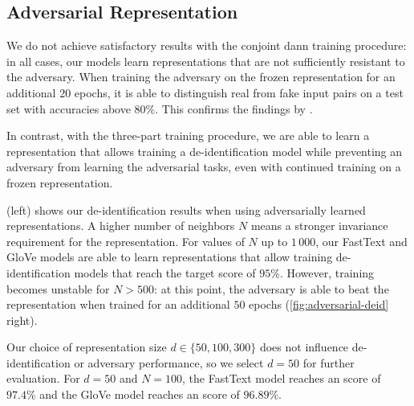 \subsection{Adversarial Representation}
%
We do not achieve satisfactory results with the conjoint \ac{dann} training procedure: in all cases, our models learn representations that are not sufficiently resistant to the adversary.
%
When training the adversary on the frozen representation for an additional $20$ epochs, it is able to distinguish real from fake input pairs on a test set with accuracies above $80\%$.
%
This confirms the findings by \citet{elazar2018adversarial}.

%
In contrast, with the three-part training procedure, we are able to learn a representation that allows training a de-identification model while preventing an adversary from learning the adversarial tasks, even with continued training on a frozen representation.

%
 (left) shows our de-identification results when using adversarially learned representations.
%
A higher number of neighbors $N$ means a stronger invariance requirement for the representation.
%
For values of $N$ up to $1\,000$, our FastText and GloVe models are able to learn representations that allow training de-identification models that reach the target \fone score of $95\%$.
%
However, training becomes unstable for $N>500$: at this point, the adversary is able to beat the representation when trained for an additional $50$ epochs (\cref{fig:adversarial-deid} right).

%
Our choice of representation size $d \in \{50, 100, 300\}$ does not influence de-identifi\-ca\-tion or adversary performance, so we select $d=50$ for further evaluation.
%
For $d=50$ and $N=100$, the FastText model reaches an \fone score of $97.4\%$ and the GloVe model reaches an \fone score of $96.89\%$.

\begin{figure*}
    \centering
    
    \caption[De-identification with adversarially learned representations]{%
        Left: de-identification \fone scores of our models using an adversarially trained representation with different numbers of neighbors $N$ for the representation invariance requirement.
        Right: mean adversary accuracy when trained on the frozen representation for an additional $50$ epochs.
    }\label{fig:adversarial-deid}
\end{figure*}

